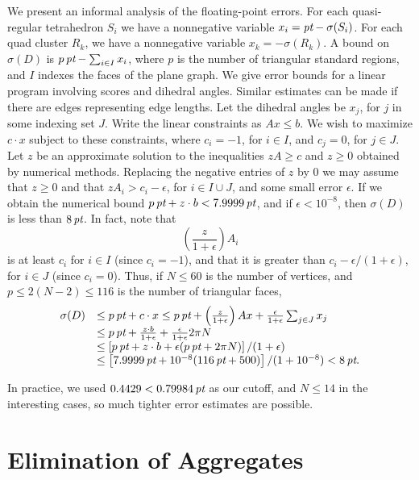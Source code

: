 We present an informal analysis of the floating-point errors.  For
each quasi-regular tetrahedron $S_i$ we have a nonnegative
variable $x_i = \hbox{\it pt}-\sigma(S_i)$. For each quad cluster $R_k$, we
have a nonnegative variable $x_k = -\sigma(R_k)$.  A bound on
$\sigma(D)$ is $p\,\hbox{\it pt}-\sum_{i\in I} x_i$, where $p$ is the number
of triangular standard regions, and $I$ indexes the faces of the
plane graph. We give error bounds for a linear program involving
scores and dihedral angles.  Similar estimates can be made if
there are edges representing edge lengths. Let the dihedral angles
be $x_j$, for $j$ in some indexing set $J$.  Write the linear
constraints as $Ax\le b$.  We wish to maximize $c\cdot x$ subject
to these constraints, where $c_i=-1$, for $i\in I$, and $c_j=0$,
for $j\in J$.  Let $z$ be an approximate solution to the
inequalities $zA\ge c$ and  $z\ge 0$ obtained by numerical
methods.  Replacing the negative entries of $z$ by $0$ we may
assume that $z\ge0$ and that $zA_i> c_i-\epsilon$, for $i\in I\cup
J$, and some small error $\epsilon$. If we obtain the numerical
bound $p\,\hbox{\it pt}+z\cdot b< 7.9999\,\hbox{\it pt}$, and if $\epsilon<10^{-8}$,
then $\sigma(D)$ is less than $8\,\hbox{\it pt}$. In fact, note that
$$\left(\frac{z}{1+\epsilon}\right) A_i$$
is at least $c_i$ for $i\in I$ (since $c_i=-1$), and that it is
greater than $c_i - \epsilon/(1+\epsilon)$, for $i\in J$ (since
$c_i=0$). Thus, if $N\le 60$ is the number of vertices, and $p\le
2(N-2)\le116$ is the number of triangular faces,
    $$
    \begin{array}{lll}
     \sigma(D) &\le p\,\hbox{\it pt} + c\cdot x \le
         p\,\hbox{\it pt} + \left(\frac{z}{1+\epsilon}\right) A x
        + {\frac{\epsilon}{1+\epsilon}\sum_{j\in J} x_j}\\
    &\le p\,\hbox{\it pt} + \frac{z\cdot b}{1+\epsilon} +
        {\frac{\epsilon}{1+\epsilon} 2\pi N} \\
    &\le \left[{p\,\hbox{\it pt}+z\cdot b +
        {\epsilon}(p\,\hbox{\it pt}+2\pi N)}\right]/(1+\epsilon)\\
    &\le \left[7.9999\,\hbox{\it pt} +
        10^{-8}(116\,\hbox{\it pt}+500)\right]/(1+10^{-8}) <8\,\hbox{\it pt}.
    \end{array}
    $$

In practice, we used $0.4429< 0.79984\,\hbox{\it pt}$ as our cutoff, and
$N\le 14$ in the interesting cases, so much tighter error
estimates are possible.


\chapter{Elimination of Aggregates} \label{sec:noaggregate}

